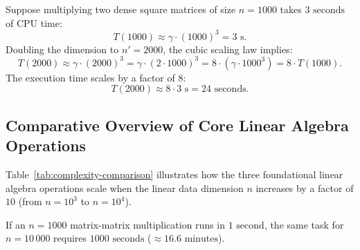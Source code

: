 \begin{example}
Suppose multiplying two dense square matrices of size $n = 1000$ takes $3\text{ seconds}$ of CPU time:
\begin{equation}
    T(1000) \approx \gamma \cdot (1000)^3 = 3\text{ s}.
\end{equation}
Doubling the dimension to $n' = 2000$, the cubic scaling law implies:
\begin{equation}
    T(2000) \approx \gamma \cdot (2000)^3 = \gamma \cdot (2 \cdot 1000)^3 = 8 \cdot \left(\gamma \cdot 1000^3\right) = 8 \cdot T(1000).
\end{equation}
The execution time scales by a factor of $8$:
\begin{equation}
    T(2000) \approx 8 \cdot 3\text{ s} = 24\text{ seconds}.
\end{equation}
\end{example}

\subsection{Comparative Overview of Core Linear Algebra Operations}

Table~\ref{tab:complexity-comparison} illustrates how the three foundational linear algebra operations scale when the linear data dimension $n$ increases by a factor of $10$ (from $n = 10^3$ to $n = 10^4$).

\begin{table}[H]
\centering
{}
\caption{Complexity comparison and scaling factors for a tenfold increase in dimension.}
\label{tab:complexity-comparison}
\end{table}

If an $n = 1000$ matrix-matrix multiplication runs in $1\text{ second}$, the same task for $n = 10\,000$ requires $1000\text{ seconds}$ ($\approx 16.6\text{ minutes}$).

